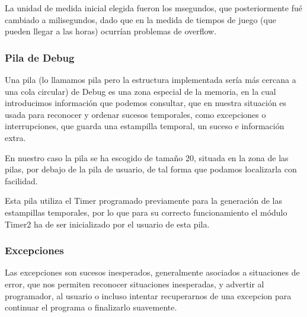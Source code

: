 \documentclass[12pt,letterpaper]{article}
\begin{document}
La unidad de medida inicial elegida fueron los \textgreek{m}segundos,
que posteriormente fué cambiado a milisegundos, dado que en la medida
de tiempos de juego (que pueden llegar a las horas) ocurrían problemas
de overflow.

\subsubsection{Pila de Debug}
\label{subsubsec:piladebug}
Una pila (lo llamamos pila pero la estructura implementada sería más
cercana a una cola circular) de Debug es una zona especial de la
memoria, en la cual introducimos información que podemos consultar,
que en nuestra situación es usada para reconocer y ordenar sucesos
temporales, como excepciones o interrupciones, que guarda una
estampilla temporal, un suceso e información extra.

En nuestro caso la pila se ha escogido de tamaño 20, situada en la
zona de las pilas, por debajo de la pila de usuario, de tal forma que
podamos localizarla con facilidad.

Esta pila utiliza el Timer programado previamente para la generación
de las estampillas temporales, por lo que para su correcto funcionamiento
el módulo Timer2 ha de ser inicializado por el usuario de esta pila.

\subsubsection{Excepciones}
\label{subsubsec:excepciones}
Las excepciones son sucesos inesperados, generalmente asociados a
situaciones de error, que nos permiten reconocer situaciones
inesperadas, y advertir al programador, al usuario o incluso intentar
recuperarnos de una excepcion para continuar el programa o finalizarlo
suavemente.
\end{document}
